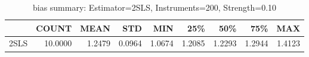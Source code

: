 \begin{table}[ht]
\centering
\caption{bias summary: Estimator=2SLS, Instruments=200, Strength=0.10}
\begin{tabular}{lrrrrrrrr}
\toprule
 & COUNT & MEAN & STD & MIN & 25\% & 50\% & 75\% & MAX \\
\midrule
2SLS & 10.0000 & 1.2479 & 0.0964 & 1.0674 & 1.2085 & 1.2293 & 1.2944 & 1.4123 \\
\bottomrule
\end{tabular}
\end{table}
